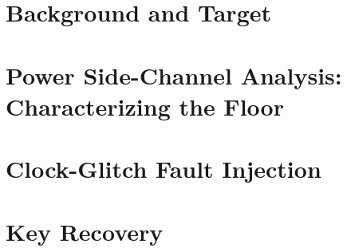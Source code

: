 \documentclass[a4paper,11pt,twocolumn]{article}
\newif\blackbox
\newif\demoonly
\newif\negativeonly
\begin{document}
\section{Background and Target}

\section{Power Side-Channel Analysis: Characterizing the Floor}

\section{Clock-Glitch Fault Injection}

\section{Key Recovery}
\end{document}
